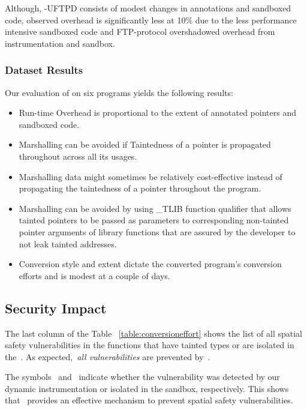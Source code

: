 Although, \systemname-UFTPD consists of modest changes in annotations and sandboxed code, observed overhead is significantly less at 10\% due to the less performance intensive sandboxed code and FTP-protocol overshadowed overhead from \systemname instrumentation and sandbox.     


\subsubsection{\textbf{\systemname Dataset Results}}
Our evaluation of \systemname on six programs yields the following results:
\begin{itemize}
  \item Run-time Overhead is proportional to the extent of 
annotated pointers and sandboxed code.
  \item Marshalling can be avoided if Taintedness of a pointer is propagated throughout across all its usages.
  \item Marshalling data might sometimes be relatively cost-effective instead of propagating the taintedness of a pointer throughout the program.
  \item Marshalling can be avoided by using \_TLIB function qualifier that allows tainted pointers to be passed as parameters to corresponding non-tainted pointer arguments of library functions that are assured by the developer to not leak tainted addresses.
  \item Conversion style and extent dictate the converted program's conversion efforts and is modest at a couple of days.   
\end{itemize}


\subsection{Security Impact}
\label{subsec:securityimpact}
The last column of the Table ~\ref{table:conversioneffort} shows the list of all spatial safety vulnerabilities in the functions that have tainted types or are isolated in the~\ucregion{}.
As expected,~\emph{all vulnerabilities} are prevented by~\systemname{}.

The symbols~\vulprevented{} and~\vulisolated{} indicate whether the vulnerability was detected by our dynamic instrumentation or isolated in the sandbox, respectively.
This shows that~\systemname{} provides an effective mechanism to prevent spatial safety vulnerabilities.



